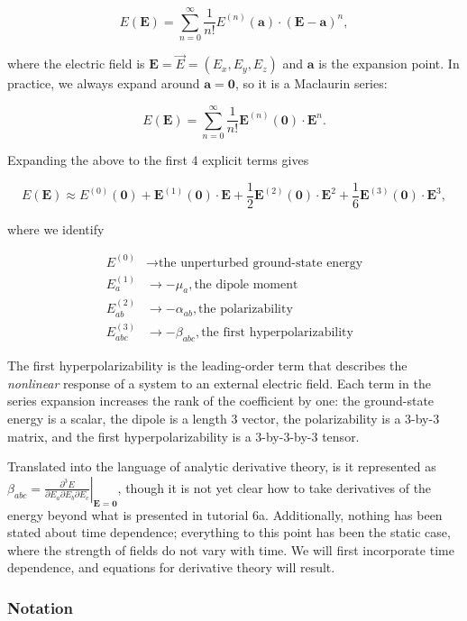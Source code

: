 \documentclass[11pt]{article}
\begin{document}
\[
E(\mathbf{E}) = \sum_{n=0}^{\infty} \frac{1}{n!}E^{(n)}(\mathbf{a})\cdot(\mathbf{E}-\mathbf{a})^{n},
\]

where the electric field is \(\mathbf{E} = \vec{E} = (E_x,E_y,E_z)\) and
\(\mathbf{a}\) is the expansion point. In practice, we always expand
around \(\mathbf{a} = \mathbf{0}\), so it is a Maclaurin series:

\[
E(\mathbf{E}) = \sum_{n=0}^{\infty} \frac{1}{n!}\mathbf{E}^{(n)}(\mathbf{0})\cdot\mathbf{E}^{n}.
\]

Expanding the above to the first 4 explicit terms gives

\[
E(\mathbf{E}) \approx E^{(0)}(\mathbf{0}) + \mathbf{E}^{(1)}(\mathbf{0})\cdot\mathbf{E} + \frac{1}{2}\mathbf{E}^{(2)}(\mathbf{0})\cdot\mathbf{E}^{2} + \frac{1}{6}\mathbf{E}^{(3)}(\mathbf{0})\cdot\mathbf{E}^{3},
\]

where we identify

\begin{align}
E^{(0)} &\rightarrow \textrm{the unperturbed ground-state energy} \\
E_{a}^{(1)} &\rightarrow -\mu_{a},\textrm{the dipole moment} \\
E_{ab}^{(2)} &\rightarrow -\alpha_{ab},\textrm{the polarizability} \\
E_{abc}^{(3)} &\rightarrow -\beta_{abc},\textrm{the first hyperpolarizability}
\end{align}

The first hyperpolarizability is the leading-order term that describes
the \emph{nonlinear} response of a system to an external electric field.
Each term in the series expansion increases the rank of the coefficient
by one: the ground-state energy is a scalar, the dipole is a length 3
vector, the polarizability is a 3-by-3 matrix, and the first
hyperpolarizability is a 3-by-3-by-3 tensor.

Translated into the language of analytic derivative theory, is it
represented as
\(\beta_{abc} = \left.\frac{\partial^{3} E}{\partial E_a \partial E_b \partial E_c}\right|_{\mathbf{E}=\mathbf{0}}\),
though it is not yet clear how to take derivatives of the energy beyond
what is presented in tutorial 6a. Additionally, nothing has been stated
about time dependence; everything to this point has been the static
case, where the strength of fields do not vary with time. We will first
incorporate time dependence, and equations for derivative theory will
result.

\hypertarget{notation}{%
\subsubsection{Notation}\label{notation}}
\end{document}

